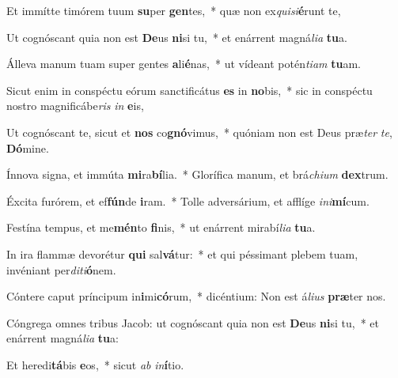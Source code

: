 \item Et immítte timórem tuum \textbf{su}per \textbf{gen}tes,~* quæ non ex\textit{qui}\textit{si}\textbf{é}runt te,
\item Ut cognóscant quia non est \textbf{De}us \textbf{ni}si tu,~* et enárrent magná\textit{li}\textit{a} \textbf{tu}a.
\item Álleva manum tuam super gentes \textbf{a}li\textbf{é}nas,~* ut vídeant potén\textit{ti}\textit{am} \textbf{tu}am.
\item Sicut enim in conspéctu eórum sanctificátus \textbf{es} in \textbf{no}bis,~* sic in conspéctu nostro magnificábe\textit{ris} \textit{in} \textbf{e}is,
\item Ut cognóscant te, sicut et \textbf{nos} co\textbf{gnó}vimus,~* quóniam non est Deus præ\textit{ter} \textit{te}, \textbf{Dó}mine.
\item Ínnova signa, et immúta \textbf{mi}ra\textbf{bí}lia.~* Glorífica manum, et brá\textit{chi}\textit{um} \textbf{dex}trum.
\item Éxcita furórem, et ef\textbf{fún}de \textbf{i}ram.~* Tolle adversárium, et afflíge \textit{in}\textit{i}\textbf{mí}cum.
\item Festína tempus, et me\textbf{mén}to \textbf{fi}nis,~* ut enárrent mirabí\textit{li}\textit{a} \textbf{tu}a.
\item In ira flammæ devorétur \textbf{qui} sal\textbf{vá}tur:~* et qui péssimant plebem tuam, invéniant per\textit{di}\textit{ti}\textbf{ó}nem.
\item Cóntere caput príncipum in\textbf{i}mi\textbf{có}rum,~* dicéntium: Non est á\textit{li}\textit{us} \textbf{præ}ter nos.
\item Cóngrega omnes tribus Jacob: ut cognóscant quia non est \textbf{De}us \textbf{ni}si tu,~* et enárrent magná\textit{li}\textit{a} \textbf{tu}a:
\item Et heredi\textbf{tá}bis \textbf{e}os,~* sicut \textit{ab} \textit{in}\textbf{í}tio.
